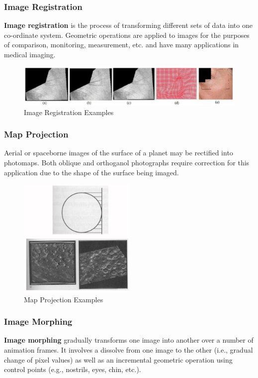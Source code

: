 \documentclass[a4paper,11pt]{article}
\begin{document}
\subsubsection{Image Registration}
\textbf{Image registration} is the process of transforming different sets of data into one co-ordinate system.
Geometric operations are applied to images for the purposes of comparison, monitoring, measurement, etc. and have many applications in medical imaging.

\begin{figure}[H]
    \centering
    \includegraphics[width=\textwidth]{images/image_registration.png}
    \caption{Image Registration Examples}
\end{figure}

\subsubsection{Map Projection}
Aerial or spaceborne images of the surface of a planet may be rectified into photomaps.
Both oblique and orthoganol photographs require correction for this application due to the shape of the surface being imaged.

\begin{figure}[H]
    \centering
    \includegraphics[width=0.5\textwidth]{images/map_projection.png}
    \caption{Map Projection Examples}
\end{figure}

\subsubsection{Image Morphing}
\textbf{Image morphing} gradually transforms one image into another over a number of animation frames.
It involves a dissolve from one image to the other (i.e., gradual change of pixel values) as well as an incremental geometric operation using control points (e.g., nostrils, eyes, chin, etc.).
\end{document}
